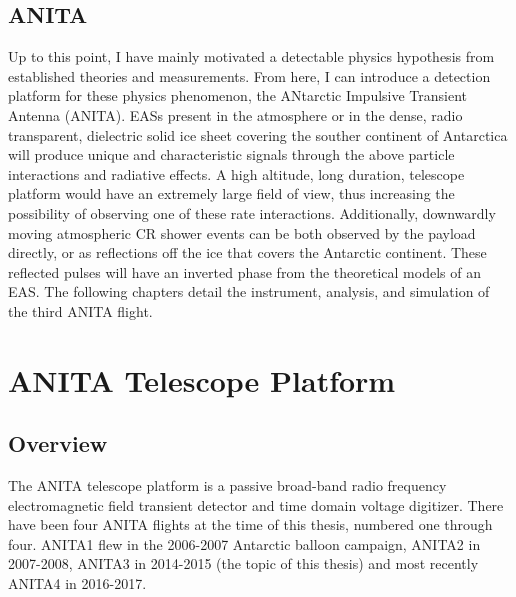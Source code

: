 \section{ANITA}
	Up to this point, I have mainly motivated a detectable physics hypothesis from established theories and measurements.  From here, I can introduce a detection platform for these physics phenomenon, the ANtarctic Impulsive Transient Antenna (ANITA).  EASs present in the atmosphere or in the dense, radio transparent, dielectric solid ice sheet covering the souther continent of Antarctica will produce unique and characteristic signals through the above particle interactions and radiative effects.  A high altitude, long duration, telescope platform would have an extremely large field of view, thus increasing the possibility of observing one of these rate interactions.  Additionally, downwardly moving atmospheric CR shower events can be both observed by the payload directly, or as reflections off the ice that covers the Antarctic continent.  These reflected pulses will have an inverted phase from the theoretical models of an EAS.  The following chapters detail the instrument, analysis, and simulation of the third ANITA flight.





\chapter{ANITA Telescope Platform}
\section{Overview}
	The ANITA telescope platform is a passive broad-band radio frequency electromagnetic field transient detector and time domain voltage digitizer.  There have been four ANITA flights at the time of this thesis, numbered one through four.  ANITA1 flew in the 2006-2007 Antarctic balloon campaign\cite{ANITA1}, ANITA2 in 2007-2008\cite{ANITA2}, ANITA3 in 2014-2015 (the topic of this thesis) and most recently ANITA4 in 2016-2017.  
	
